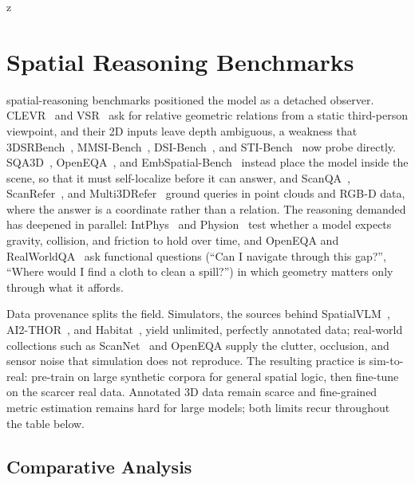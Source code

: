 z\section{Spatial Reasoning Benchmarks}
\label{sec:p3_s7_5}

 spatial-reasoning benchmarks positioned the model as a detached observer. CLEVR~\cite{johnson2017clevr} and VSR~\cite{liu2023visual} ask for relative geometric relations from a static third-person viewpoint, and their 2D inputs leave depth ambiguous, a weakness that 3DSRBench~\cite{ma20253dsrbench}, MMSI-Bench~\cite{yang2025mmsi}, DSI-Bench~\cite{zhang2025dsi}, and STI-Bench~\cite{li2025sti} now probe directly.
SQA3D~\cite{ma2022sqa3d}, OpenEQA~\cite{majumdar2024openeqa}, and EmbSpatial-Bench~\cite{du2024embspatial} instead place the model inside the scene, so that it must self-localize before it can answer, and ScanQA~\cite{azuma2022scanqa}, ScanRefer~\cite{chen2020scanrefer}, and Multi3DRefer~\cite{zhang2023multi3drefer} ground queries in point clouds and RGB-D data, where the answer is a coordinate rather than a relation.
The reasoning demanded has deepened in parallel: IntPhys~\cite{riochet2018intphys} and Physion~\cite{Bear2021Physion} test whether a model expects gravity, collision, and friction to hold over time, and OpenEQA and RealWorldQA~\cite{xai2024grok15v} ask functional questions (``Can I navigate through this gap?'', ``Where would I find a cloth to clean a spill?'') in which geometry matters only through what it affords.

Data provenance splits the field. Simulators, the sources behind SpatialVLM~\cite{chen2024spatialvlm}, AI2-THOR~\cite{kolve2017ai2thor}, and Habitat~\cite{szot2021habitat2}, yield unlimited, perfectly annotated data; real-world collections such as ScanNet~\cite{dai2017scannet} and OpenEQA supply the clutter, occlusion, and sensor noise that simulation does not reproduce.
The resulting practice is sim-to-real: pre-train on large synthetic corpora for general spatial logic, then fine-tune on the scarcer real data.
Annotated 3D data remain scarce and fine-grained metric estimation remains hard for large models; both limits recur throughout the table below.



\subsection{Comparative Analysis}
\label{subsec:p3-sec7-5-comparative-analysis}


